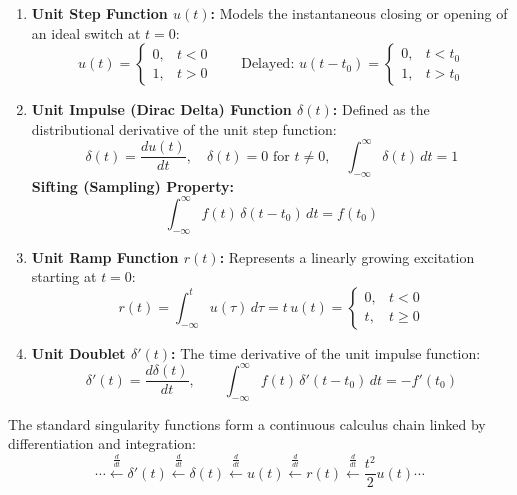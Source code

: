 \documentclass[12pt,a4paper]{article}
\begin{document}
\begin{tcolorbox}[defbox, title={\textbf{Definitions of Core Singularity Functions}}]
\begin{enumerate}[leftmargin=*, itemsep=4pt]
  \item \textbf{Unit Step Function $u(t)$:} Models the instantaneous closing or opening of an ideal switch at $t = 0$:
  \begin{equation}
    u(t) = \begin{cases} 0, & t < 0 \\ 1, & t > 0 \end{cases} \qquad \text{Delayed: } u(t - t_0) = \begin{cases} 0, & t < t_0 \\ 1, & t > t_0 \end{cases}
  \end{equation}
  \item \textbf{Unit Impulse (Dirac Delta) Function $\delta(t)$:} Defined as the distributional derivative of the unit step function:
  \begin{equation}
    \delta(t) = \frac{du(t)}{dt}, \quad \delta(t) = 0 \text{ for } t \ne 0, \quad \int_{-\infty}^{\infty} \delta(t)\,dt = 1
  \end{equation}
  \textbf{Sifting (Sampling) Property:}
  \begin{equation}
    \int_{-\infty}^{\infty} f(t)\,\delta(t - t_0)\,dt = f(t_0)
  \end{equation}
  \item \textbf{Unit Ramp Function $r(t)$:} Represents a linearly growing excitation starting at $t=0$:
  \begin{equation}
    r(t) = \int_{-\infty}^t u(\tau)\,d\tau = t\,u(t) = \begin{cases} 0, & t < 0 \\ t, & t \ge 0 \end{cases}
  \end{equation}
  \item \textbf{Unit Doublet $\delta'(t)$:} The time derivative of the unit impulse function:
  \begin{equation}
    \delta'(t) = \frac{d\delta(t)}{dt}, \qquad \int_{-\infty}^\infty f(t)\,\delta'(t - t_0)\,dt = -f'(t_0)
  \end{equation}
\end{enumerate}
\end{tcolorbox}

\begin{tcolorbox}[formulabox, title={\textbf{Hierarchy of Singularity Functions}}]
The standard singularity functions form a continuous calculus chain linked by differentiation and integration:
\begin{equation}
  \cdots \xleftarrow{\frac{d}{dt}} \delta'(t) \xleftarrow{\frac{d}{dt}} \delta(t) \xleftarrow{\frac{d}{dt}} u(t) \xleftarrow{\frac{d}{dt}} r(t) \xleftarrow{\frac{d}{dt}} \frac{t^2}{2}u(t) \cdots
\end{equation}
\end{tcolorbox}
\end{document}
